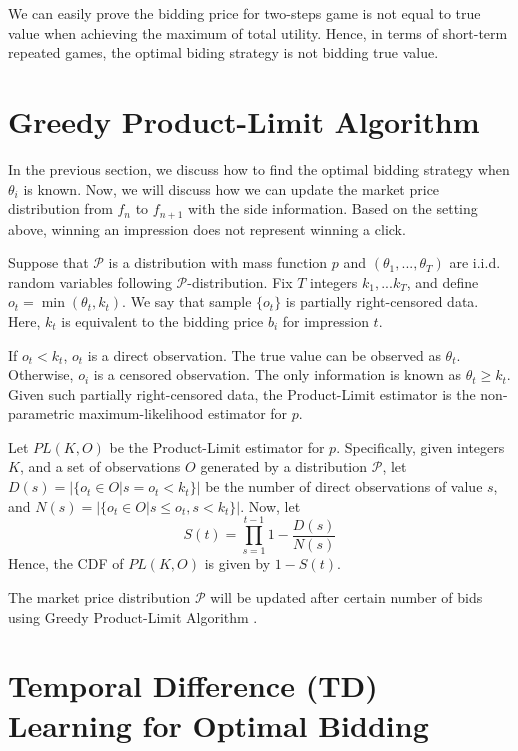 We can easily prove the bidding price for two-steps game is not equal to true value when achieving the maximum of total utility. Hence, in terms of short-term repeated games, the optimal biding strategy is not bidding true value.

\section{Greedy Product-Limit Algorithm}
In the previous section, we discuss how to find the optimal bidding strategy when $\theta_i$ is known. Now, we will discuss how we can update the market price distribution from $f_n$ to $f_{n+1}$ with the side information. Based on the setting above, winning an impression does not represent winning a click.

Suppose that $\mathcal{P}$ is a distribution with mass function $p$ and $(\theta_1,...,\theta_T)$ are i.i.d. random variables following $\mathcal{P}$-distribution. Fix $T$ integers $k_1,...k_T$, and define $o_t=\min (\theta_t,k_t)$. We say that sample $\{ o_t \}$ is partially right-censored data. Here, $k_t$ is equivalent to the bidding price $b_i$ for impression $t$.

If $o_t<k_t$, $o_t$ is a direct observation. The true value can be observed as $\theta_t$. Otherwise, $o_i$ is a censored observation. The only information is known as $\theta_t \geq k_t$. Given such partially right-censored data, the Product-Limit estimator is the non-parametric maximum-likelihood estimator for $p$.

Let $PL(K,O)$ be the Product-Limit estimator for $p$. Specifically, given integers $K$, and a set of observations $O$ generated by a distribution $\mathcal{P}$, let $D(s)=|\{o_t \in O|s=o_t<k_t\}|$ be the number of direct observations of value $s$, and $N(s)=|\{o_t \in O|s \leq o_t,s<k_t\}|$. Now, let 
\begin{equation}
\label{eq:PL}
S(t)=\prod_{s=1}^{t-1}{1-\frac{D(s)}{N(s)}}
\end{equation}
Hence, the CDF of $PL(K,O)$ is given by $1-S(t)$. 

The market price distribution $\mathcal{P}$ will be updated after certain number of bids using Greedy Product-Limit Algorithm \cite{Amin_budgetoptimization}.

\section{Temporal Difference (TD) Learning for Optimal Bidding}

